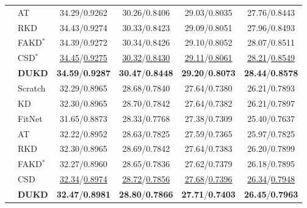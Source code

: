 \documentclass[10pt,twocolumn,letterpaper]{article}
\begin{document}
\begin{table}[]
{\begin{tabular}{@{\hspace{2pt}}l@{\hspace{1.5\tabcolsep}}lcccc@{\hspace{2pt}}}
 &
  AT &
  34.29/0.9262 &
  30.26/0.8406 &
  29.03/0.8035 &
  27.76/0.8443 \\
 &
  RKD &
  34.43/0.9274 &
  30.33/0.8423 &
  29.09/0.8051 &
  27.96/0.8493 \\
 &
  FAKD$^\ast$ &
  34.39/0.9272 &
  30.34/0.8426 &
  29.10/0.8052 &
  28.07/0.8511 \\
 &
  CSD$^\ast$ &
  \underline{34.45}/\underline{0.9275} &
  \underline{30.32}/\underline{0.8430} &
  \underline{29.11}/\underline{0.8061} &
  \underline{28.21}/\underline{0.8549} \\
 &
  \textbf{DUKD} &
  \textbf{34.59}/\textbf{0.9287} &
  \textbf{30.47}/\textbf{0.8448} &
  \textbf{29.20}/\textbf{0.8073} &
  \textbf{28.44}/\textbf{0.8578} \\ \midrule
\multirow{8}{*}{\texttimes4} &
  Scratch &
  32.29/0.8965 &
  28.68/0.7840 &
  27.64/0.7380 &
  26.21/0.7893 \\
 &
  KD &
  32.30/0.8965 &
  28.70/0.7842 &
  27.64/0.7382 &
  26.21/0.7897 \\
 &
  FitNet &
  31.65/0.8873 &
  28.33/0.7768 &
  27.38/0.7309 &
  25.40/0.7637 \\
 &
  AT &
  32.22/0.8952 &
  28.63/0.7825 &
  27.59/0.7365 &
  25.97/0.7825 \\
 &
  RKD &
  32.30/0.8965 &
  28.69/0.7842 &
  27.64/0.7383 &
  26.20/0.7899 \\
 &
  FAKD$^\ast$ &
  32.27/0.8960 &
  28.65/0.7836 &
  27.62/0.7379 &
  26.18/0.7895 \\
 &
  CSD &
  \underline{32.34}/\underline{0.8974} &
  \underline{28.72}/\underline{0.7856} &
  \underline{27.68}/\underline{0.7396} &
  \underline{26.34}/\underline{0.7948} \\
 &
  \textbf{DUKD} &
  \textbf{32.47}/\textbf{0.8981} &
  \textbf{28.80}/\textbf{0.7866} &
  \textbf{27.71}/\textbf{0.7403} &
  \textbf{26.45}/\textbf{0.7963} \\ \bottomrule
\end{tabular}}
\end{table}
\end{document}
